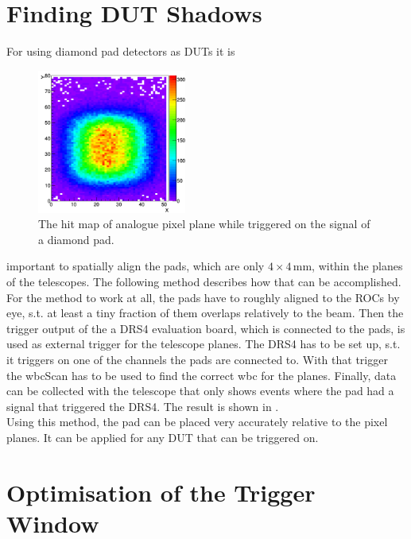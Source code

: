\documentclass[british,11pt,a4paper]{memoir}
\begin{document}
\section{Finding \ac{DUT} Shadows}
For using diamond pad detectors as \ac{DUT}s it is
\begin{figure}
	\vspace*{-10pt}
	\includegraphics[width=4.9cm]{diashadow}
	\caption{The hit map of analogue pixel plane while triggered on the signal of a diamond pad.}
	\label{pdiashodow}
	\vspace*{-5pt}
\end{figure} 
important to spatially align the pads, which are only $4\times4\,$mm, within the planes of the telescopes. The following method describes how that can be accomplished.\\
For the method to work at all, the pads have to roughly aligned to the \ac{ROC}s by eye, s.t. at least a tiny fraction of them overlaps relatively to the beam. Then the trigger output of the a DRS4 evaluation board, which is connected to the pads, is used as external trigger for the telescope planes. The DRS4 has to be set up, s.t. it triggers on one of the channels the pads are connected to. With that trigger the wbcScan has to be used to find the correct wbc for the planes. Finally, data can be collected with the telescope that only shows events where the pad had a signal that triggered the DRS4. The result is shown in .\\
Using this method, the pad can be placed very accurately relative to the pixel planes. It can be applied for any \ac{DUT} that can be triggered on.
\section{Optimisation of the Trigger Window}

\end{document}
